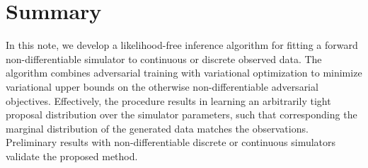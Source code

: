 \documentclass[twocolumn,superscriptaddress,aps]{revtex4-1}
\newcommand{\bftheta}{{\bm \theta}}
\newcommand{\bfpsi}{{\bm \psi}}
\newcommand{\bfphi}{{\bm \phi}}
\newcommand{\bfx}{\mathbf{x}}
\theoremstyle{plain}
\begin{document}
%
%
%
%
%





\section{Summary}

In this note, we develop a likelihood-free inference algorithm for fitting a
forward non-differentiable simulator to continuous or discrete observed data.
The algorithm combines adversarial training  with variational optimization to
minimize variational upper bounds  on the otherwise non-differentiable
adversarial objectives.
Effectively, the procedure results in learning an arbitrarily tight proposal
distribution over the simulator parameters, such that corresponding the marginal
distribution of the generated data matches the observations. Preliminary results
with non-differentiable discrete or continuous simulators validate the proposed method.
\end{document}
